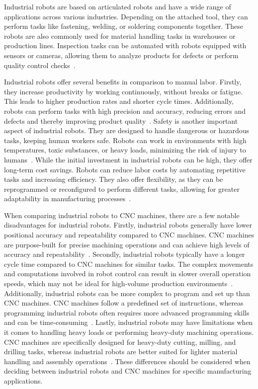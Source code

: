 Industrial robots are based on articulated robots and have a wide range of applications across various industries. Depending on the attached tool, they can perform tasks like fastening, welding, or soldering components together. These robots are also commonly used for material handling tasks in warehouses or production lines. Inspection tasks can be automated with robots equipped with sensors or cameras, allowing them to analyze products for defects or perform quality control checks~\cite{Hagele.2016}.


Industrial robots offer several benefits in comparison to manual labor. Firstly, they increase productivity by working continuously, without breaks or fatigue. This leads to higher production rates and shorter cycle times. Additionally, robots can perform tasks with high precision and accuracy, reducing errors and defects and thereby improving product quality~\cite{Kubela.2016}. Safety is another important aspect of industrial robots. They are designed to handle dangerous or hazardous tasks, keeping human workers safe. Robots can work in environments with high temperatures, toxic substances, or heavy loads, minimizing the risk of injury to humans~\cite{Heyer.2010}.
While the initial investment in industrial robots can be high, they offer long-term cost savings. Robots can reduce labor costs by automating repetitive tasks and increasing efficiency. They also offer flexibility, as they can be reprogrammed or reconfigured to perform different tasks, allowing for greater adaptability in manufacturing processes~\cite{Jung.2020b}.

When comparing industrial robots to \acrshort{CNC} machines, there are a few notable disadvantages for industrial robots. Firstly, industrial robots generally have lower positional accuracy and repeatability compared to \acrshort{CNC} machines. \acrshort{CNC} machines are purpose-built for precise machining operations and can achieve high levels of accuracy and repeatability~\cite{Wang.2023}.
Secondly, industrial robots typically have a longer cycle time compared to \acrshort{CNC} machines for similar tasks. The complex movements and computations involved in robot control can result in slower overall operation speeds, which may not be ideal for high-volume production environments~\cite{Joshi.2021}.
Additionally, industrial robots can be more complex to program and set up than \acrshort{CNC} machines. \acrshort{CNC} machines follow a predefined set of instructions, whereas programming industrial robots often requires more advanced programming skills and can be time-consuming~\cite{Ye.2022}. Lastly, industrial robots may have limitations when it comes to handling heavy loads or performing heavy-duty machining operations. \acrshort{CNC} machines are specifically designed for heavy-duty cutting, milling, and drilling tasks, whereas industrial robots are better suited for lighter material handling and assembly operations~\cite{Wu.2022}. These differences should be considered when deciding between industrial robots and \acrshort{CNC} machines for specific manufacturing applications.


